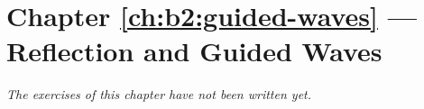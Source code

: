\section*{Chapter \ref{ch:b2:guided-waves} --- Reflection and Guided Waves}


\emph{The exercises of this chapter have not been written yet.}
